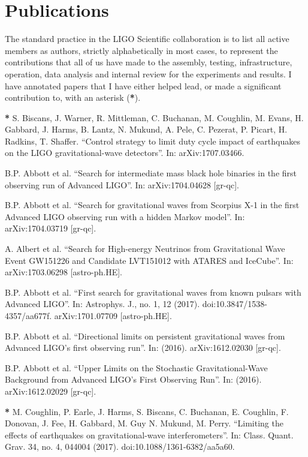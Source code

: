 \section{\sc Publications}

The standard practice in the LIGO Scientific collaboration is to list all active members as authors, strictly alphabetically in most cases, to represent the contributions that all of us have made to the assembly, testing, infrastructure, operation, data analysis and internal review for the experiments and results. I have annotated papers that I have either helped lead, or made a significant contribution to, with an asterisk (\textbf{*}). 

\textbf{*} S. Biscans, J. Warner, R. Mittleman, C. Buchanan, M. Coughlin, M. Evans, H. Gabbard, J. Harms, B. Lantz, N. Mukund, A. Pele, C. Pezerat, P. Picart, H. Radkins, T. Shaffer. ``Control strategy to limit duty cycle impact of earthquakes on the LIGO gravitational-wave detectors''. In: arXiv:1707.03466.

B.P. Abbott et al. ``Search for intermediate mass black hole binaries in the first observing run of Advanced LIGO''. In: arXiv:1704.04628 [gr-qc].

B.P. Abbott et al. ``Search for gravitational waves from Scorpius X-1 in the first Advanced LIGO observing run with a hidden Markov model''. In: arXiv:1704.03719 [gr-qc].

A. Albert et al. ``Search for High-energy Neutrinos from Gravitational Wave Event GW151226 and Candidate LVT151012 with ATARES and IceCube''.  In: arXiv:1703.06298 [astro-ph.HE].

B.P. Abbott et al. ``First search for gravitational waves from known pulsars with Advanced LIGO''. In: Astrophys. J., no. 1, 12 (2017). doi:10.3847/1538-4357/aa677f. arXiv:1701.07709 [astro-ph.HE].

B.P. Abbott et al. ``Directional limits on persistent gravitational waves from Advanced LIGO's first observing run''. In: (2016). arXiv:1612.02030 [gr-qc].

B.P. Abbott et al. ``Upper Limits on the Stochastic Gravitational-Wave Background from Advanced LIGO's First Observing Run''. In: (2016). arXiv:1612.02029 [gr-qc].

\textbf{*} M. Coughlin, P. Earle, J. Harms, S. Biscans, C. Buchanan, E. Coughlin, F. Donovan, J. Fee, H. Gabbard, M. Guy N. Mukund, M. Perry. ``Limiting the effects of earthquakes on gravitational-wave interferometers''. In: Class. Quant. Grav.  34, no. 4, 044004 (2017). doi:10.1088/1361-6382/aa5a60.

